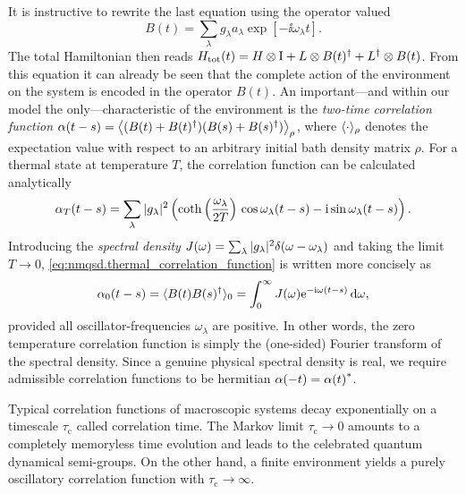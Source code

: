 It is instructive to rewrite the last equation using the operator valued 
\begin{equation}
  B(t)=\sum_\lambda g_\lambda a_\lambda \exp[-\ii\omega_\lambda t].
  \label{eq:nmqsd.force_operator}
\end{equation}
The total Hamiltonian then reads $H_\mathrm{tot}(t) = H \otimes \mathrm{I}  +  L \otimes B(t)^\dagger  +  L^\dagger \otimes B(t)$.
From this equation it can already be seen that the complete action of the environment on the system is encoded in the operator $B(t)$.
An important---and within our model the only---characteristic of the environment is the \emph{two-time correlation function} $\alpha(t-s) = \big\langle  (B(t) + B(t)^\dagger)(B(s) + B(s)^\dagger) \big\rangle_\rho$, where $\langle \cdot \rangle_\rho$ denotes the expectation value with respect to an arbitrary initial bath density matrix $\rho$.
For a thermal state at temperature $T$, the correlation function can be calculated analytically \cite{FeHi10_path_integrals}
\begin{equation}
  \alpha_T(t - s) = \sum_\lambda  \vert g_\lambda \vert^2  \left( \operatorname{coth} \left( \frac{\omega_\lambda}{2T} \right) \, \cos \omega_\lambda (t-s)  -  \mathrm{i} \sin \omega_\lambda(t-s) \right).
  \label{eq:nmqsd.thermal_correlation_function}
\end{equation}
Introducing the \emph{spectral density} $J(\omega) = \sum_\lambda \vert g_\lambda \vert^2 \delta(\omega - \omega_\lambda)$ and taking the limit $T \to 0$, \autoref{eq:nmqsd.thermal_correlation_function} is written more concisely as
\begin{equation}
  \alpha_0(t - s) = \qmean{B(t)\adj{B(s)}}_0 = \int_0^\infty J(\omega) \exp[-\ii\omega (t-s)] \dd \omega,
  \label{eq:nmqsd.correlation_function}
\end{equation}
provided all oscillator-frequencies $\omega_\lambda$ are positive.
In other words, the zero temperature correlation function is simply the (one-sided) Fourier transform of the spectral density.
Since a genuine physical spectral density is real, we require admissible correlation functions to be hermitian $\alpha(-t) = {\alpha(t)}^*$.

Typical correlation functions of macroscopic systems decay exponentially on a timescale $\tau_\mathrm{c}$ called correlation time.
The Markov limit $\tau_\mathrm{c} \to 0$ amounts to a completely memoryless time evolution and leads to the celebrated quantum dynamical semi-groups.
On the other hand, a finite environment yields a purely oscillatory correlation function with $\tau_\mathrm{c} \to \infty$.

